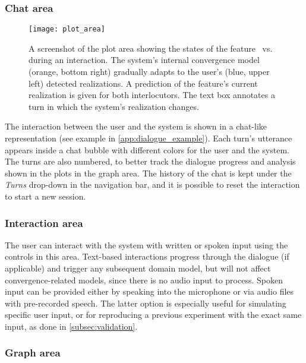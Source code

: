 \subsubsection{Chat area}
\label{subsubsec:chat_area}

\begin{figure}[t]
	\centering
	\texttt{[image: plot\_area]}
	\caption[Real-time visualization of phonetic changes]{A screenshot of the plot area showing the states of the feature \textipa{[E:]}~vs.~\textipa{[e:]} during an interaction.
		The system's internal convergence model (orange, bottom right) gradually adapts to the user's (blue, upper left) detected realizations.
		A prediction of the feature's current realization is given for both interlocutors.
		The text box annotates a turn in which the system's realization changes.}
	\label{fig:plot}
\end{figure}

The interaction between the user and the system is shown in a chat-like representation (see example in \cref{app:dialogue_example}).
Each turn's utterance appears inside a chat bubble with different colors for the user and the system.
The turns are also numbered, to better track the dialogue progress and analysis shown in the plots in the graph area.
The history of the chat is kept under the \emph{Turns} drop-down in the navigation bar, and it is possible to reset the interaction to start a new session.

\subsubsection{Interaction area}
\label{subsubsec:interaction_area}

The user can interact with the system with written or spoken input using the controls in this area.
Text-based interactions progress through the dialogue (if applicable) and trigger any subsequent domain model, but will not affect convergence-related models, since there is no audio input to process.
Spoken input can be provided either by speaking into the microphone or via audio files with pre-recorded speech.
The latter option is especially useful for simulating specific user input, or for reproducing a previous experiment with the exact same input, as done in \cref{subsec:validation}.

\subsubsection{Graph area}
\label{subsubsec:graph_area}

